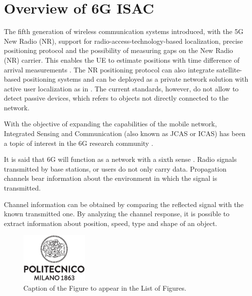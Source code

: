 \section{Overview of 6G ISAC}

The fifth generation of wireless communication systems introduced, with the 5G New Radio (NR), support for radio-access-technology-based localization, precise positioning protocol and the possibility of measuring gaps on the New Radio (NR) carrier. This enables the UE to estimate positions with time difference of arrival measurements \cite{Keating_Saily_Hulkkonen_Karjalainen_2019} . \newline
The NR positioning protocol can also integrate satellite-based positioning systems and can be deployed as a private network solution with active user localization as in \cite{Henninger_Abrudan_Mandelli_Arnold_Saur_Kolmonen_Klein_Schlitter_Brink_2022}.
The current standards, however, do not allow to detect passive devices, which refers to objects not directly connected to the network.

With the objective of expanding the capabilities of the mobile network, Integrated Sensing and Communication (also known as JCAS or ICAS) has been a topic of interest in the 6G research community \cite{Mandelli_Henninger_Bauhofer_Wild_2023}. 

It is said that 6G will function as a network with a sixth sense \cite{Viswanathan_Wild_2021}. Radio signals transmitted by base stations, or users do not only carry data. Propagation channels bear information about the environment in which the signal is transmitted. 

Channel information can be obtained by comparing the reflected signal with the known transmitted one. By analyzing the channel response, it is possible to extract information about position, speed, type and shape of an object.

\begin{figure}[H]
    \centering
    \includegraphics[width=0.3\textwidth]{Images/logo_polimi_scritta.eps}
    \caption{Caption of the Figure to appear in the List of Figures.}
    \label{fig:ISAC-scheme}
\end{figure}


